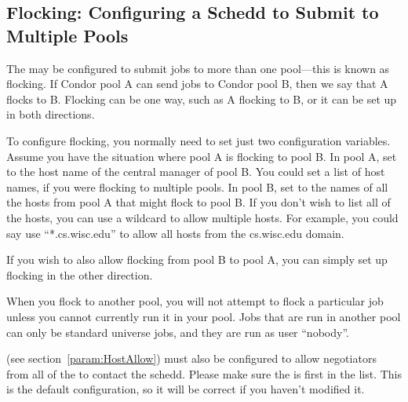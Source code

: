 \subsection{\label{sec:Flocking}
Flocking: Configuring a Schedd to Submit to Multiple Pools}

The  may be configured to submit jobs to more than one
pool---this is known as flocking. If Condor pool A can send jobs to
Condor pool B, then we say that A flocks to B. Flocking can be one
way, such as A flocking to B, or it can be set up in both directions. 

To configure flocking, you normally need to set just two configuration
variables. Assume you have the situation where pool A is flocking to
pool B. In pool A, set  to the host name of the
central manager of pool B. You could set a list of host names, if you
were flocking to multiple pools. In pool B, set 
to the names of all the hosts from pool A that might flock to pool
B. If you don't wish to list all of the hosts, you can use a wildcard
to allow multiple hosts. For example, you could say use
``*.cs.wisc.edu'' to allow all hosts from the cs.wisc.edu domain. 

If you wish to also allow flocking from pool B to pool A, you can
simply set up flocking in the other direction.

When you flock to another pool, you will not attempt to flock a
particular job unless you cannot currently run it in your pool. Jobs
that are run in another pool can only be standard universe jobs, and
they are run as user ``nobody''.

 (see
section~\ref{param:HostAllow}) must also be configured to allow
negotiators from all of the  to
contact the schedd.  Please make sure the 
is first in the  list.  This
is the default configuration, so it will be correct if you haven't
modified it.


